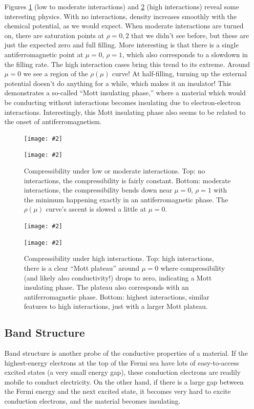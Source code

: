 \documentclass{article}
\newcommand{\nicegraphic}[2][1]{
	\begin{center}
		\texttt{[image: \#2]}
	\end{center}
}
\begin{document}
Figures \ref{fig:compresslow} (low to moderate interactions) and \ref{fig:compresshigh} (high interactions) reveal some interesting physics. With no interactions, density increases smoothly with the chemical potential, as we would expect. When moderate interactions are turned on, there are saturation points at $\rho = 0, 2$ that we didn't see before, but these are just the expected zero and full filling. More interesting is that there is a single antiferromagnetic point at $\mu = 0$, $\rho = 1$, which also corresponds to a slowdown in the filling rate. The high interaction cases bring this trend to its extreme. Around $\mu = 0$ we see a  region of the $\rho(\mu)$ curve! At half-filling, turning up the external potential doesn't do anything for a while, which makes it an insulator! This demonstrates a so-called ``Mott insulating phase,'' where a material which would be conducting without interactions becomes insulating due to electron-electron interactions. Interestingly, this Mott insulating phase also seems to be related to the onset of antiferromagnetism.

\begin{figure}
\nicegraphic{fermi_hubbard_compressibility_U0_t4}
\nicegraphic{fermi_hubbard_compressibility_U1_t1}
\caption{Compressibility under low or moderate interactions. Top: no interactions, the compressibility is fairly constant. Bottom: moderate interactions, the compressibility bends down near $\mu = 0$, $\rho = 1$ with the minimum happening exactly in an antiferromagnetic phase. The $\rho(\mu)$ curve's ascent is slowed a little at $\mu = 0$.}
\label{fig:compresslow}
\end{figure}
\begin{figure}
\nicegraphic{fermi_hubbard_compressibility_U4_t1}
\nicegraphic{fermi_hubbard_compressibility_U8_t1}
\caption{Compressibility under high interactions. Top: high interactions, there is a clear ``Mott plateau'' around $\mu = 0$ where compressibility (and likely also conductivity!) drops to zero, indicating a Mott insulating phase. The plateau also corresponds with an antiferromagnetic phase. Bottom: highest interactions, similar features to high interactions, just with a larger Mott plateau.}
\label{fig:compresshigh}
\end{figure}

\subsection{Band Structure}
Band structure is another probe of the conductive properties of a material. If the highest-energy electrons at the top of the Fermi sea have lots of easy-to-access excited states (a very small energy gap), these conduction electrons are readily mobile to conduct electricity. On the other hand, if there is a large gap between the Fermi energy and the next excited state, it becomes very hard to excite conduction electrons, and the material becomes insulating.
\end{document}
